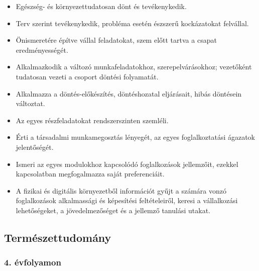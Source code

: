 \begin{itemize}
\item
  Egészség- és környezettudatosan dönt és tevékenykedik.
\item
  Terv szerint tevékenykedik, probléma esetén észszerű kockázatokat
  felvállal.
\item
  Önismeretére építve vállal feladatokat, szem előtt tartva a csapat
  eredményességét.
\item
  Alkalmazkodik a változó munkafeladatokhoz, szerepelvárásokhoz;
  vezetőként tudatosan vezeti a csoport döntési folyamatát.
\item
  Alkalmazza a döntés-előkészítés, döntéshozatal eljárásait, hibás
  döntésein változtat.
\item
  Az egyes részfeladatokat rendszerszinten szemléli.
\item
  Érti a társadalmi munkamegosztás lényegét, az egyes foglalkoztatási
  ágazatok jelentőségét.
\item
  Ismeri az egyes modulokhoz kapcsolódó foglalkozások jellemzőit,
  ezekkel kapcsolatban megfogalmazza saját preferenciáit.
\item
  A fizikai és digitális környezetből információt gyűjt a számára vonzó
  foglalkozások alkalmassági és képesítési feltételeiről, keresi a
  vállalkozási lehetőségeket, a jövedelmezőséget és a jellemző tanulási
  utakat.
\end{itemize}

\hypertarget{termeszettudomany}{%
\subsection{Természettudomány}\label{termeszettudomany}}

\hypertarget{evfolyamon-31}{%
\subsubsection{4. évfolyamon}\label{evfolyamon-31}}

